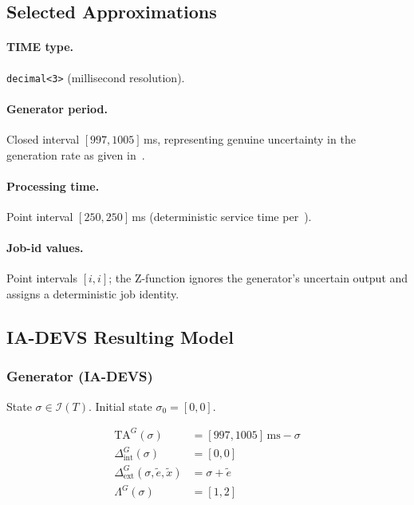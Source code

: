 \subsection*{Selected Approximations}

\paragraph{TIME type.}  \texttt{decimal<3>} (millisecond resolution).

\paragraph{Generator period.}  Closed interval $[997,1005]$\,ms, representing
genuine uncertainty in the generation rate as given in~\cite{VDW21}.

\paragraph{Processing time.}  Point interval $[250,250]$\,ms (deterministic
service time per~\cite{VDW21}).

\paragraph{Job-id values.}  Point intervals $[i,i]$; the Z-function ignores the
generator's uncertain output and assigns a deterministic job identity.

\subsection*{IA-DEVS Resulting Model}

\subsubsection*{Generator (IA-DEVS)}

State $\sigma \in \mathcal{I}(T)$.  Initial state $\sigma_0 = [0,0]$.

\begin{align*}
  \mathrm{TA}^G(\sigma)             &= [997,1005]\,\text{ms} - \sigma \\
  \Delta^G_{\text{int}}(\sigma)     &= [0,0] \\
  \Delta^G_{\text{ext}}(\sigma, \tilde{e}, \tilde{x}) &= \sigma + \tilde{e} \\
  \Lambda^G(\sigma)                 &= [1,2]
\end{align*}

